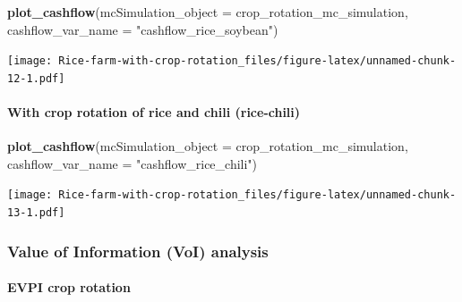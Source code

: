 \documentclass[
]{article}
\newenvironment{Shaded}{\begin{snugshade}}{\end{snugshade}}
\newcommand{\AttributeTok}[1]{\textcolor[rgb]{0.13,0.29,0.53}{#1}}
\newcommand{\DecValTok}[1]{\textcolor[rgb]{0.00,0.00,0.81}{#1}}
\newcommand{\FunctionTok}[1]{\textcolor[rgb]{0.13,0.29,0.53}{\textbf{#1}}}
\newcommand{\NormalTok}[1]{#1}
\newcommand{\OtherTok}[1]{\textcolor[rgb]{0.56,0.35,0.01}{#1}}
\newcommand{\SpecialCharTok}[1]{\textcolor[rgb]{0.81,0.36,0.00}{\textbf{#1}}}
\newcommand{\StringTok}[1]{\textcolor[rgb]{0.31,0.60,0.02}{#1}}
\begin{document}
\begin{Shaded}
\begin{Highlighting}[]
\FunctionTok{plot\_cashflow}\NormalTok{(}\AttributeTok{mcSimulation\_object =}\NormalTok{ crop\_rotation\_mc\_simulation, }\AttributeTok{cashflow\_var\_name =} \StringTok{"cashflow\_rice\_soybean"}\NormalTok{)}
\end{Highlighting}
\end{Shaded}

\texttt{[image: Rice-farm-with-crop-rotation\_files/figure-latex/unnamed-chunk-12-1.pdf]}

\hypertarget{with-crop-rotation-of-rice-and-chili-rice-chili}{%
\paragraph{With crop rotation of rice and chili
(rice-chili)}\label{with-crop-rotation-of-rice-and-chili-rice-chili}}

\begin{Shaded}
\begin{Highlighting}[]
\FunctionTok{plot\_cashflow}\NormalTok{(}\AttributeTok{mcSimulation\_object =}\NormalTok{ crop\_rotation\_mc\_simulation, }\AttributeTok{cashflow\_var\_name =} \StringTok{"cashflow\_rice\_chili"}\NormalTok{)}
\end{Highlighting}
\end{Shaded}

\texttt{[image: Rice-farm-with-crop-rotation\_files/figure-latex/unnamed-chunk-13-1.pdf]}

\hypertarget{value-of-information-voi-analysis}{%
\subsubsection{Value of Information (VoI)
analysis}\label{value-of-information-voi-analysis}}

\begin{Shaded}
\end{Shaded}

\hypertarget{evpi-crop-rotation}{%
\paragraph{EVPI crop rotation}\label{evpi-crop-rotation}}
\end{document}

